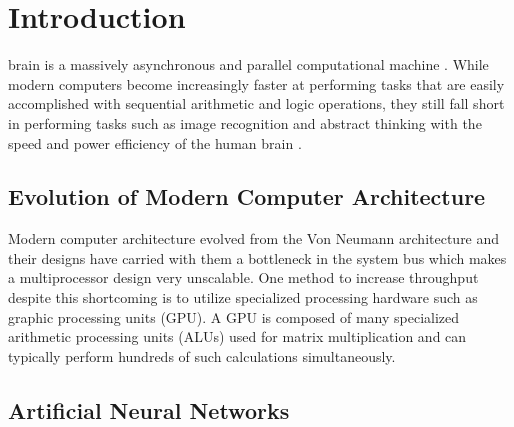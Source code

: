 \documentclass[journal]{IEEEtran}
\begin{document}

\section{Introduction}
% 
% 
% 
% 

 brain is a massively asynchronous and parallel computational machine \cite{zeki2015massively,hawkins2004intelligence,shanahan2015technological}. While modern computers become increasingly faster at performing tasks that are easily accomplished with sequential arithmetic and logic operations, they still fall short in performing tasks such as image recognition and abstract thinking with the speed and power efficiency of the human brain \cite{hawkins2004intelligence,shanahan2015technological}. 

\subsection{Evolution of Modern Computer Architecture}

Modern computer architecture evolved from the Von Neumann architecture and their designs have carried with them a bottleneck in the system bus which makes a multiprocessor design very unscalable. One method to increase throughput despite this shortcoming is to utilize specialized processing hardware such as graphic processing units (GPU). A GPU is composed of many specialized arithmetic processing units (ALUs) used for matrix multiplication and can typically perform hundreds of such calculations simultaneously.

\subsection{Artificial Neural Networks}
\end{document}
